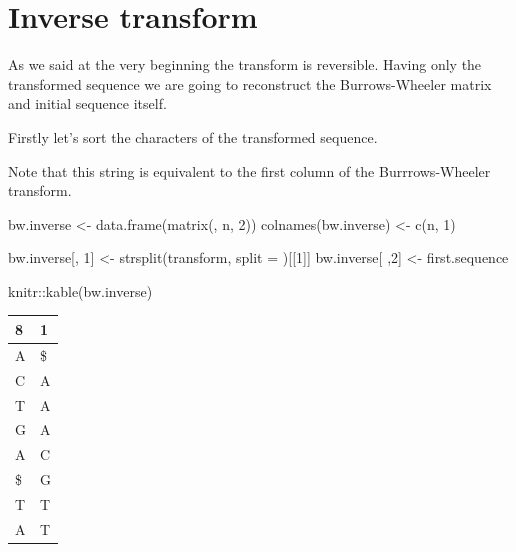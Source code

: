 \documentclass[
]{book}
\newenvironment{Shaded}{\begin{snugshade}}{\end{snugshade}}
\newcommand{\AttributeTok}[1]{\textcolor[rgb]{0.77,0.63,0.00}{#1}}
\newcommand{\CommentTok}[1]{\textcolor[rgb]{0.56,0.35,0.01}{\textit{#1}}}
\newcommand{\DecValTok}[1]{\textcolor[rgb]{0.00,0.00,0.81}{#1}}
\newcommand{\FunctionTok}[1]{\textcolor[rgb]{0.00,0.00,0.00}{#1}}
\newcommand{\NormalTok}[1]{#1}
\newcommand{\OtherTok}[1]{\textcolor[rgb]{0.56,0.35,0.01}{#1}}
\newcommand{\SpecialCharTok}[1]{\textcolor[rgb]{0.00,0.00,0.00}{#1}}
\newcommand{\StringTok}[1]{\textcolor[rgb]{0.31,0.60,0.02}{#1}}
\begin{document}
\hypertarget{inverse-transform}{%
\section{Inverse transform}\label{inverse-transform}}

As we said at the very beginning the transform is reversible. Having only the transformed sequence we are going to reconstruct the Burrows-Wheeler matrix and initial sequence itself.

Firstly let's sort the characters of the transformed sequence.

\begin{Shaded}
\end{Shaded}

Note that this string is equivalent to the first column of the Burrrows-Wheeler transform.

\begin{Shaded}
\begin{Highlighting}[numbers=left,,]
\NormalTok{bw.inverse           }\OtherTok{\textless{}{-}} \FunctionTok{data.frame}\NormalTok{(}\FunctionTok{matrix}\NormalTok{(, n, }\DecValTok{2}\NormalTok{))}
\FunctionTok{colnames}\NormalTok{(bw.inverse) }\OtherTok{\textless{}{-}} \FunctionTok{c}\NormalTok{(n, }\DecValTok{1}\NormalTok{)}

\NormalTok{bw.inverse[, }\DecValTok{1}\NormalTok{] }\OtherTok{\textless{}{-}} \FunctionTok{strsplit}\NormalTok{(transform, }\AttributeTok{split =} \StringTok{\textquotesingle{}\textquotesingle{}}\NormalTok{)[[}\DecValTok{1}\NormalTok{]]}
\NormalTok{bw.inverse[ ,}\DecValTok{2}\NormalTok{] }\OtherTok{\textless{}{-}}\NormalTok{ first.sequence}

\NormalTok{knitr}\SpecialCharTok{::}\FunctionTok{kable}\NormalTok{(bw.inverse)}
\end{Highlighting}
\end{Shaded}

\begin{tabular}{l|l}
\hline
8 & 1\\
\hline
A & \$\\
\hline
C & A\\
\hline
T & A\\
\hline
G & A\\
\hline
A & C\\
\hline
\$ & G\\
\hline
T & T\\
\hline
A & T\\
\hline
\end{tabular}
\end{document}
